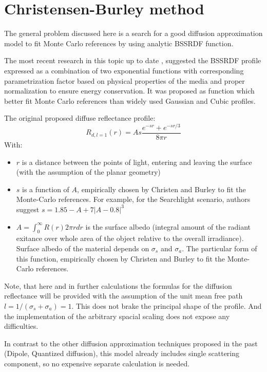 \section{Christensen-Burley method}
The general problem discussed here is a search for a good diffusion approximation model to fit Monte
Carlo references by using analytic BSSRDF function.

The most recent research in this topic up to date
\cite{Christensen:2015:ARP:2775280.2792555}, \cite{Burley:disney_siggraph15}
suggested the \gls{BSSRDF} profile expressed as a combination of two exponential functions with
corresponding parametrization factor based on physical properties of the media and proper
normalization to ensure energy conservation. It was proposed as function which better fit Monte
Carlo references than widely used Gaussian and Cubic profiles.

The original proposed diffuse reflectance profile:
\begin{equation}\label{eq:burley}
R_{d,l=1}(r) = As\dfrac{e^{-sr}+e^{-sr/3}}{8\pi r}
\end{equation}
With:
\begin{itemize}
    \item{$r$ is a distance between the points of light, entering and leaving
    the surface (with the assumption of the planar geometry)}
    \item{$s$ is a function of $A$, empirically chosen by Christen and Burley
    to fit the Monte-Carlo references. For example, for the Searchlight
    scenario, authors suggest $s = 1.85 - A + 7|A-0.8|^3$}
    \item{ $A=\int_0^{\infty} R(r)2\pi rdr$ is the surface albedo (integral
    amount of the radiant exitance over whole area of the object relative to the
    overall irradiance). Surface albedo of the material depends on $\sigma_s$
    and $\sigma_a$. The particular form of this function, empirically chosen by
    Christen and Burley to fit the Monte-Carlo references.}
\end{itemize}


Note, that here and in further calculations the formulas for the diffusion reflectance will be
provided with the assumption of the unit mean free path $l = 1/(\sigma_s + \sigma_a)=1$.
This does not brake the principal shape of the profile. And the implementation of the arbitrary
spacial scaling does not expose any difficulties.

In contrast to the other diffusion approximation techniques proposed in the past (Dipole, Quantized
diffusion), this model already includes single scattering component, so no expensive separate
calculation is needed.


